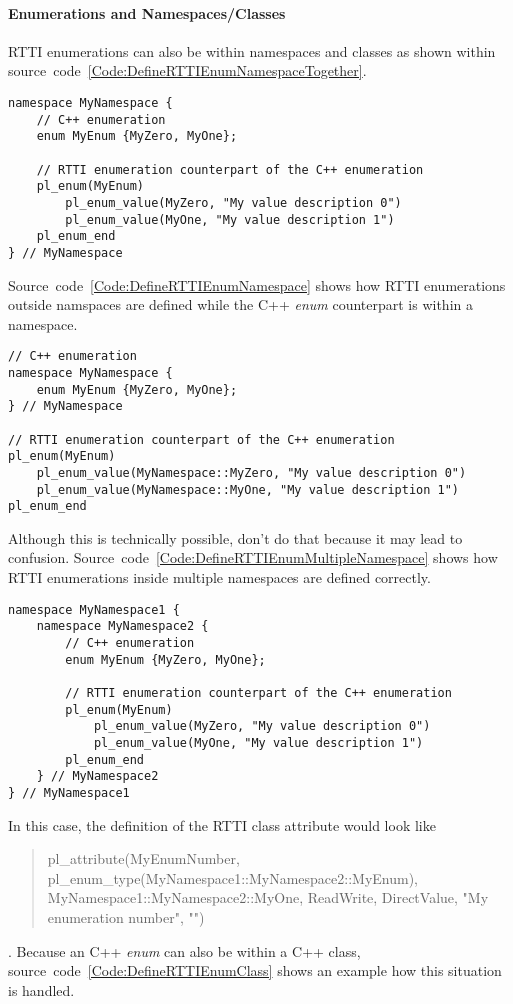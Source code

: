 \paragraph{Enumerations and Namespaces/Classes}
\ac{RTTI} enumerations can also be within namespaces and classes as shown within source~code~\ref{Code:DefineRTTIEnumNamespaceTogether}.
\begin{lstlisting}[float=htb,label=Code:DefineRTTIEnumNamespaceTogether,caption={Defining a new \ac{RTTI} enumeration within a namespace}]
namespace MyNamespace {
	// C++ enumeration
	enum MyEnum {MyZero, MyOne};

	// RTTI enumeration counterpart of the C++ enumeration
	pl_enum(MyEnum)
		pl_enum_value(MyZero, "My value description 0")
		pl_enum_value(MyOne, "My value description 1")
	pl_enum_end
} // MyNamespace
\end{lstlisting}
Source~code~\ref{Code:DefineRTTIEnumNamespace} shows how \ac{RTTI} enumerations outside namspaces are defined while the C++ \emph{enum} counterpart is within a namespace.
\begin{lstlisting}[float=htb,label=Code:DefineRTTIEnumNamespace,caption={Defining a new \ac{RTTI} enumeration with ugly mixed namespaces}]
// C++ enumeration
namespace MyNamespace {
	enum MyEnum {MyZero, MyOne};
} // MyNamespace

// RTTI enumeration counterpart of the C++ enumeration
pl_enum(MyEnum)
	pl_enum_value(MyNamespace::MyZero, "My value description 0")
	pl_enum_value(MyNamespace::MyOne, "My value description 1")
pl_enum_end
\end{lstlisting}
Although this is technically possible, don't do that because it may lead to confusion. Source~code~\ref{Code:DefineRTTIEnumMultipleNamespace} shows how \ac{RTTI} enumerations inside multiple namespaces are defined correctly.
\begin{lstlisting}[label=Code:DefineRTTIEnumMultipleNamespace,caption={Defining a new \ac{RTTI} enumeration within multiple namespaces}]
namespace MyNamespace1 {
	namespace MyNamespace2 {
		// C++ enumeration
		enum MyEnum {MyZero, MyOne};

		// RTTI enumeration counterpart of the C++ enumeration
		pl_enum(MyEnum)
			pl_enum_value(MyZero, "My value description 0")
			pl_enum_value(MyOne, "My value description 1")
		pl_enum_end
	} // MyNamespace2
} // MyNamespace1
\end{lstlisting}
In this case, the definition of the \ac{RTTI} class attribute would look like \begin{quote}pl\_attribute(MyEnumNumber, pl\_enum\_type(MyNamespace1::MyNamespace2::MyEnum), MyNamespace1::MyNamespace2::MyOne, ReadWrite, DirectValue, "My enumeration number", "")\end{quote}. Because an C++ \emph{enum} can also be within a C++ class, source~code~\ref{Code:DefineRTTIEnumClass} shows an example how this situation is handled.
